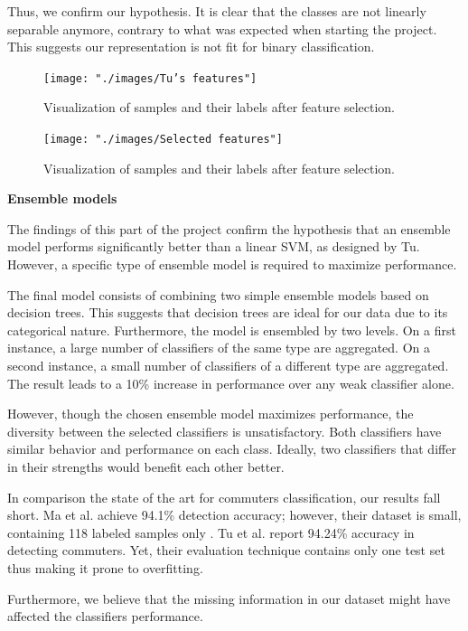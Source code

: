 \documentclass{article}
\begin{document}
Thus, we confirm our hypothesis. It is clear that the classes are not linearly separable anymore, contrary to what was expected when starting the project. This suggests our representation is not fit for binary classification.
  
\begin{figure}[H]
  \centering
  \texttt{[image: "./images/Tu's features"]}
  \caption{Visualization of samples and their labels after feature selection.}
  \label{fig:classification/tu}
\end{figure} 

\begin{figure}[H]
  \centering
  \texttt{[image: "./images/Selected features"]}
  \caption{Visualization of samples and their labels after feature selection.}
  \label{fig:classification/tsne}
\end{figure}  

\textbf{Ensemble models}

The findings of this part of the project confirm the hypothesis that an ensemble model performs significantly better than a linear SVM, as designed by Tu. However, a specific type of ensemble model is required to maximize performance. 

The final model consists of combining two simple ensemble models based on decision trees. This suggests that decision trees are ideal for our data due to its categorical nature. Furthermore, the model is ensembled by two levels. On a first instance, a large number of classifiers of the same type are aggregated. On a second instance, a small number of classifiers of a different type are aggregated. The result leads to a 10\% increase in performance over any weak classifier alone.  

However, though the chosen ensemble model maximizes performance, the diversity between the selected classifiers is unsatisfactory. Both classifiers have similar behavior and performance on each class. Ideally, two classifiers that differ in their strengths would benefit each other better. 

In comparison the state of the art for commuters classification, our results fall short. Ma et al. achieve 94.1\% detection accuracy; however, their dataset is small, containing 118 labeled samples only \cite{ma2017understanding}. Tu et al. report 94.24\% accuracy in detecting commuters. Yet, their evaluation technique contains only one test set thus making it prone to overfitting. 

Furthermore, we believe that the missing information in our dataset might have affected the classifiers performance. 
\end{document}
